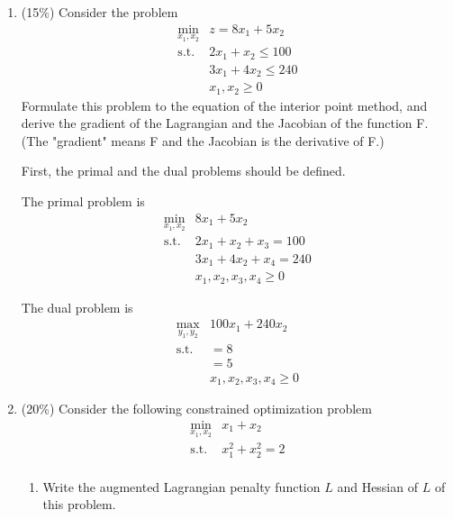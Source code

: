 \documentclass[a4paper,10pt]{article}
\begin{document}
\begin{enumerate}
\item (15\%) Consider the problem 
\begin{equation}\label{(3)}
    \begin{array}{cc}
        \displaystyle\min_{x_1,x_2} & z = 8x_1 + 5x_2 \\
        \mbox{s.t.} & 2x_1 + x_2 \le 100  \\
        & 3x_1 + 4x_2 \le 240   \\
        & x_1, x_2 \ge 0
    \end{array}
\end{equation}
Formulate this problem to the equation of the interior point method, and
derive the gradient of the Lagrangian and the Jacobian of the function F.
(The "gradient" means F and the Jacobian is the derivative of F.)

{\color{blue} 
First, the primal and the dual problems should be defined.

The primal problem is
\[
    \begin{array}{cc}
        \displaystyle\min_{x_1,x_2} & 8x_1 + 5x_2 \\
        \mbox{s.t.} & 2x_1 + x_2 + x_3 = 100  \\
        & 3x_1 + 4x_2 + x_4 = 240   \\
        & x_1, x_2, x_3, x_4 \ge 0
    \end{array}
\]

The dual problem is
\[
    \begin{array}{cc}
        \displaystyle \max_{y_1,y_2} & 100x_1 + 240x_2 \\
        \mbox{s.t.} & = 8  \\
        & = 5 \\
        & x_1, x_2, x_3, x_4 \ge 0
    \end{array}
\]
}

\item (20\%) Consider the following constrained optimization problem
    \begin{equation}\label{(4)}
        \begin{array}{cc}
            \displaystyle\min_{x_1,x_2} & x_1 + x_2 \\
            \mbox{s.t.} & x_1^2 + x_2^2 = 2 \\
        \end{array}
    \end{equation}

    \begin{enumerate}
        \item Write the augmented Lagrangian penalty function $L$ and Hessian of $L$ of this problem. 
        

\end{enumerate}
\end{enumerate}
\end{document}
